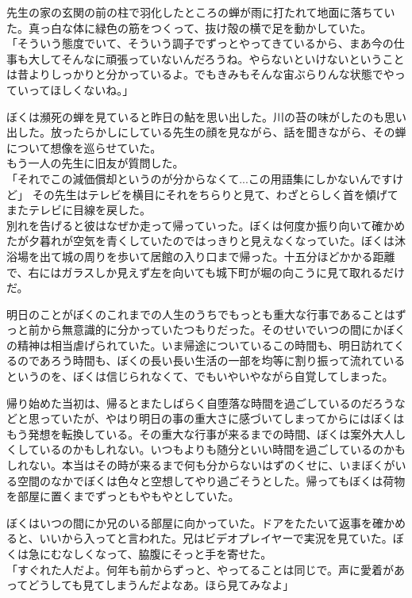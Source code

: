 \documentclass[b5j,twoside,twocolumn]{utarticle}
\begin{document}
先生の家の玄関の前の柱で羽化したところの蝉が雨に打たれて地面に落ちていた。真っ白な体に緑色の筋をつくって、抜け殻の横で足を動かしていた。\\
「そういう態度でいて、そういう調子でずっとやってきているから、まあ今の仕事も大してそんなに頑張っていないんだろうね。やらないといけないということは昔よりしっかりと分かっているよ。でもきみもそんな宙ぶらりんな状態でやっていってほしくないね。」


ぼくは瀕死の蝉を見ていると昨日の鮎を思い出した。川の苔の味がしたのも思い出した。放ったらかしにしている先生の顔を見ながら、話を聞きながら、その蝉について想像を巡らせていた。\\
もう一人の先生に旧友が質問した。\\
「それでこの減価償却というのが分からなくて...この用語集にしかないんですけど」
その先生はテレビを横目にそれをちらりと見て、わざとらしく首を傾げてまたテレビに目線を戻した。\\



別れを告げると彼はなぜか走って帰っていった。ぼくは何度か振り向いて確かめたが夕暮れが空気を青くしていたのではっきりと見えなくなっていた。ぼくは沐浴場を出て城の周りを歩いて居館の入り口まで帰った。十五分ほどかかる距離で、右にはガラスしか見えず左を向いても城下町が堀の向こうに見て取れるだけだ。


明日のことがぼくのこれまでの人生のうちでもっとも重大な行事であることはずっと前から無意識的に分かっていたつもりだった。そのせいでいつの間にかぼくの精神は相当虐げられていた。いま帰途についているこの時間も、明日訪れてくるのであろう時間も、ぼくの長い長い生活の一部を均等に割り振って流れているというのを、ぼくは信じられなくて、でもいやいやながら自覚してしまった。


帰り始めた当初は、帰るとまたしばらく自堕落な時間を過ごしているのだろうなどと思っていたが、やはり明日の事の重大さに感づいてしまってからにはぼくはもう発想を転換している。その重大な行事が来るまでの時間、ぼくは案外大人しくしているのかもしれない。いつもよりも随分といい時間を過ごしているのかもしれない。本当はその時が来るまで何も分からないはずのくせに、いまぼくがいる空間のなかでぼくは色々と空想してやり過ごそうとした。帰ってもぼくは荷物を部屋に置くまでずっともやもやとしていた。


ぼくはいつの間にか兄のいる部屋に向かっていた。ドアをたたいて返事を確かめると、いいから入ってと言われた。兄はビデオプレイヤーで実況を見ていた。ぼくは急にむなしくなって、脇腹にそっと手を寄せた。\\
「すぐれた人だよ。何年も前からずっと、やってることは同じで。声に愛着があってどうしても見てしまうんだよなあ。ほら見てみなよ」
\end{document}
